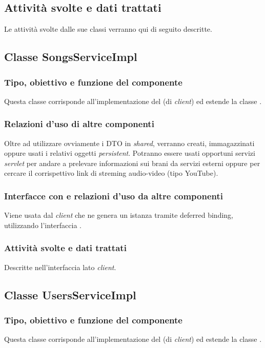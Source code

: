 \subsection*{Attivit\`a svolte e dati trattati}
Le attivit\`a svolte dalle sue classi verranno qui di seguito descritte.

\subsection{Classe SongsServiceImpl}
\subsubsection*{Tipo, obiettivo e funzione del componente}
Questa classe corrisponde all'implementazione del  (di
\emph{client}) ed estende la classe .

\subsubsection*{Relazioni d'uso di altre componenti}
Oltre ad utilizzare ovviamente i DTO in \emph{shared}, verranno creati,
immagazzinati oppure usati i relativi oggetti \emph{persistent}.
Potranno essere usati opportuni servizi \emph{servlet} per andare a prelevare
informazioni sui brani da servizi esterni oppure per cercare il corrispettivo
link di streming audio-video (tipo YouTube).

\subsubsection*{Interfacce con e relazioni d'uso da altre componenti}
Viene usata dal \emph{client} che ne genera un istanza tramite deferred binding,
utilizzando l'interfaccia .

\subsubsection*{Attivit\`a svolte e dati trattati}
Descritte nell'interfaccia lato \emph{client}.

\subsection{Classe UsersServiceImpl}
\subsubsection*{Tipo, obiettivo e funzione del componente}
Questa classe corrisponde all'implementazione del  (di
\emph{client}) ed estende la classe .

